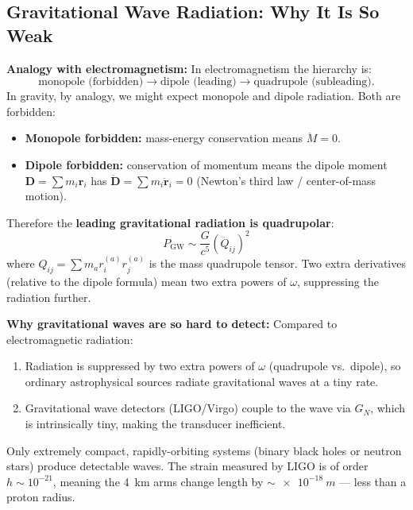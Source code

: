 \subsection{Gravitational Wave Radiation: Why It Is So Weak}

\textbf{Analogy with electromagnetism:}
In electromagnetism the hierarchy is:
\[
    \text{monopole (forbidden)} \to \text{dipole (leading)} \to \text{quadrupole (subleading)}.
\]
In gravity, by analogy, we might expect monopole and dipole radiation.  Both
are forbidden:
\begin{itemize}
    \item \textbf{Monopole forbidden:} mass-energy conservation means
    $\ddot{M} = 0$.
    \item \textbf{Dipole forbidden:} conservation of momentum means the
    dipole moment $\mathbf{D} = \sum m_i \mathbf{r}_i$ has $\ddot{\mathbf{D}}
    = \sum m_i \ddot{\mathbf{r}}_i = 0$ (Newton's third law / center-of-mass
    motion).
\end{itemize}

Therefore the \textbf{leading gravitational radiation is quadrupolar}:
\begin{equation}
    P_\text{GW} \sim \frac{G}{c^5} \left(\dddot{Q}_{ij}\right)^2
    \label{eq:lec04:GW}
\end{equation}
where $Q_{ij} = \sum m_a r_i^{(a)} r_j^{(a)}$ is the mass quadrupole tensor.
Two extra derivatives (relative to the dipole formula) mean two extra powers
of $\omega$, suppressing the radiation further.

\textbf{Why gravitational waves are so hard to detect:}
Compared to electromagnetic radiation:
\begin{enumerate}
    \item Radiation is suppressed by two extra powers of $\omega$ (quadrupole
    vs.\ dipole), so ordinary astrophysical sources radiate
    gravitational waves at a tiny rate.
    \item Gravitational wave detectors (LIGO/Virgo) couple to the wave via
    $G_N$, which is intrinsically tiny, making the transducer inefficient.
\end{enumerate}
Only extremely compact, rapidly-orbiting systems (binary black holes or
neutron stars) produce detectable waves.  The strain measured by LIGO is of
order $h \sim 10^{-21}$, meaning the \SI{4}{km} arms change length by
$\sim \SI{e-18}{m}$ — less than a proton radius.

